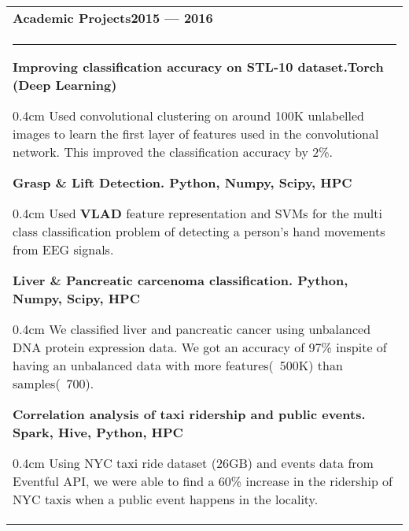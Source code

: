 \documentclass{article}
\newenvironment{projectdescription}{\begin{adjustwidth}{0.4cm}{}}{\end{adjustwidth}}
\begin{document}
\begin{tabular}{p{\dimexpr\linewidth-2\tabcolsep}}
	\bfseries \large{Academic Projects}\hfill 2015 --- 2016 \mdseries \\
	\noindent\rule{\textwidth}{0.4pt}
	\bfseries Improving classification accuracy on STL-10 dataset.\mdseries \hfill Torch (Deep Learning)

	\begin{projectdescription}
	Used convolutional clustering on around 100K unlabelled images to learn the first layer of features used in the convolutional network.  
	This improved the classification accuracy by 2\%.
	\end{projectdescription}
	\smallskip

	\bfseries Grasp \& Lift Detection. \mdseries \hfill Python, Numpy, Scipy, HPC 
	\begin{projectdescription}
	Used \textbf{VLAD} feature representation and SVMs for the multi class classification problem of detecting a person's hand movements from EEG signals.
	\end{projectdescription}
	\smallskip

	\bfseries Liver \& Pancreatic carcenoma classification.  \mdseries\hfill Python, Numpy, Scipy, HPC
	\begin{projectdescription}
			We classified liver and pancreatic cancer using unbalanced DNA protein expression data.  We got an accuracy of 97\% inspite of having an unbalanced data with more features(~500K) than samples(~700).
	\end{projectdescription}

	\smallskip

	\bfseries Correlation analysis of taxi ridership and public events. \mdseries \hfill Spark, Hive, Python, HPC
	\begin{projectdescription}
			Using NYC taxi ride dataset (26GB) and events data from Eventful API, we were able to find a 60\% increase in the ridership of NYC taxis when a public event happens in the locality.
	\end{projectdescription}
\end{tabular}
\bigskip
\end{document}
